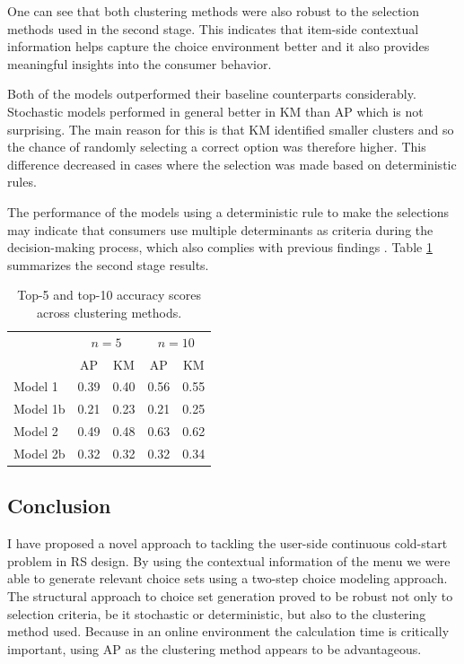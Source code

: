 \documentclass[a4paper,12pt]{article}
\begin{document}
One can see that both clustering methods were also robust to the selection methods used in the second  stage. This indicates that item-side contextual information helps capture the choice environment better and it also provides meaningful insights into the consumer behavior.
 
Both of the models outperformed their baseline counterparts considerably. Stochastic models performed in general better in KM than AP which is not surprising. The main reason for this is that KM identified smaller clusters and so the chance of randomly selecting a correct option was therefore higher. This difference decreased in cases where the selection was made based on deterministic rules.

The performance of the models using a deterministic rule to make the selections may indicate that consumers use multiple determinants as criteria during the decision-making process, which also complies with previous findings \citep{bettman1979memory, lee2004effect}. Table \ref{tab:mainResultsTwoStageModeling} summarizes the second stage results.

\begin{table}
    \centering
    \begin{tabular}{lcccc}\hline
     & \multicolumn{2}{c}{$n=5$} & \multicolumn{2}{c}{$n=10$}\\
     & AP & KM & AP & KM\\\hline
    Model 1\hspace{20mm} & 0.39 & 0.40 & 0.56 & 0.55\\
    Model 1b & 0.21 & 0.23 & 0.21 & 0.25\\
    Model 2 & 0.49 & 0.48 & 0.63 & 0.62\\
    Model 2b & 0.32 & 0.32 & 0.32 & 0.34\\\hline
    \end{tabular}
    \caption{Top-5 and top-10 accuracy scores across clustering methods.}
    \label{tab:mainResultsTwoStageModeling}
\end{table}

\subsection{Conclusion}

I have proposed a novel approach to tackling the user-side continuous cold-start problem in RS design. By using the contextual information of the menu we were able to generate relevant choice sets using a two-step choice modeling approach. The structural 
approach to choice set generation proved to be robust not only to selection criteria, be it stochastic or deterministic, but also to the clustering method used. Because in an online environment the calculation time is critically important, using AP as the clustering method appears to be advantageous.
\end{document}

